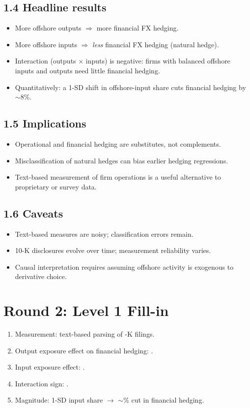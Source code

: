 \documentclass[11pt]{article}
\newcommand{\blank}[1]{\underline{\hspace{#1}}}
\begin{document}
\subsection*{1.4 Headline results}
\begin{itemize}
\item More offshore outputs $\Rightarrow$ more financial FX hedging.
\item More offshore inputs $\Rightarrow$ \emph{less} financial FX hedging (natural hedge).
\item Interaction (outputs $\times$ inputs) is negative: firms with balanced offshore inputs and outputs need little financial hedging.
\item Quantitatively: a 1-SD shift in offshore-input share cuts financial hedging by $\sim 8\%$.
\end{itemize}

\subsection*{1.5 Implications}
\begin{itemize}
\item Operational and financial hedging are substitutes, not complements.
\item Misclassification of natural hedges can bias earlier hedging regressions.
\item Text-based measurement of firm operations is a useful alternative to proprietary or survey data.
\end{itemize}

\subsection*{1.6 Caveats}
\begin{alertbox}
\begin{itemize}
\item Text-based measures are noisy; classification errors remain.
\item 10-K disclosures evolve over time; measurement reliability varies.
\item Causal interpretation requires assuming offshore activity is exogenous to derivative choice.
\end{itemize}
\end{alertbox}

\section*{Round 2: Level 1 Fill-in}
\begin{enumerate}
\item Measurement: text-based parsing of \blank{1cm}-K filings.
\item Output exposure effect on financial hedging: \blank{1cm}.
\item Input exposure effect: \blank{1cm}.
\item Interaction sign: \blank{1cm}.
\item Magnitude: 1-SD input share $\to$ $\sim$\blank{1cm}\% cut in financial hedging.
\end{enumerate}
\end{document}
